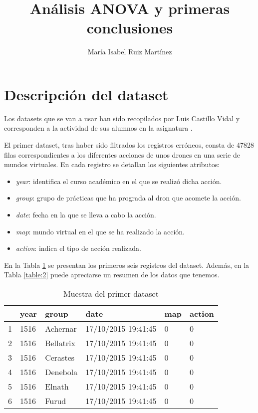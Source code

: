 \documentclass[10pt,a4paper]{article}
\author{María Isabel Ruiz Martínez}
\title{Análisis ANOVA y primeras conclusiones}
\begin{document}
\maketitle

\listoftables
\listoffigures

\section{Descripción del dataset}

Los datasets que se van a usar han sido recopilados por Luis Castillo Vidal y corresponden a la actividad de sus alumnos en la asignatura \href{https://www.ugr.es/estudiantes/grados/grado-ingenieria-informatica/desarrollo-basado-agentes-ing-software}{\color{blue}{Desarrollo Basado en Agentes}}.

El primer dataset, tras haber sido filtrados los registros erróneos, consta de 47828 filas correspondientes a los diferentes acciones de unos drones en una serie de mundos virtuales. En cada registro se detallan los siguientes atributos:
\begin{itemize}
\item \emph{year}: identifica el curso académico en el que se realizó dicha acción.
\item \emph{group}: grupo de prácticas que ha prograda al dron que acomete la acción.
\item \emph{date}: fecha en la que se lleva a cabo la acción.
\item \emph{map}: mundo virtual en el que se ha realizado la acción.
\item \emph{action}: indica el tipo de acción realizada.
\end{itemize}

En la Tabla \ref{table:1} se presentan los primeros seis registros del dataset. Además, en la Tabla \ref{table:2} puede apreciarse un resumen de los datos que tenemos.

\begin{table}[ht]
\centering
\begin{tabular}{rlllll}
  \hline
 & year & group & date & map & action \\ 
  \hline
1 & 1516 & Achernar & 17/10/2015 19:41:45 & 0 & 0 \\ 
  2 & 1516 & Bellatrix & 17/10/2015 19:41:45 & 0 & 0 \\ 
  3 & 1516 & Cerastes & 17/10/2015 19:41:45 & 0 & 0 \\ 
  4 & 1516 & Denebola & 17/10/2015 19:41:45 & 0 & 0 \\ 
  5 & 1516 & Elnath & 17/10/2015 19:41:45 & 0 & 0 \\ 
  6 & 1516 & Furud & 17/10/2015 19:41:45 & 0 & 0 \\ 
   \hline
\end{tabular}
\caption{Muestra del primer dataset}
\label{table:1}
\end{table}
\end{document}
